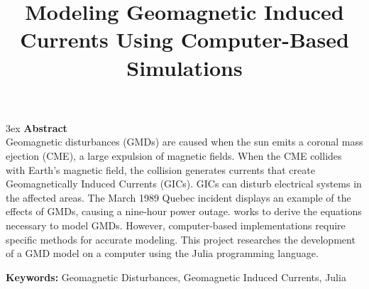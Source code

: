 \documentclass[10pt,a4paper,twoside]{article}
\renewcommand{\doctitle}        {Modeling Geomagnetic Induced Currents Using Computer-Based Simulations}
\renewcommand{\docaffiliation} { }
\renewcommand{\docauthor} { }
\begin{document}



\title{\doctitle}{\docauthor}{\docaffiliation}


\setlength\columnsep{1cm}

\begin{multicols}{2}
		
	{\parindent 3ex 
		\textbf{\textsf{Abstract}} %
		\\
		Geomagnetic disturbances (GMDs) are caused when the sun emits a coronal mass ejection (CME), a large expulsion of magnetic fields. When the CME collides with Earth's magnetic field, the collision generates currents that create Geomagnetically Induced Currents (GICs). GICs can disturb electrical systems in the affected areas. The March 1989 Quebec incident displays an example of the effects of GMDs, causing a nine-hour power outage. \cite{8859181} works to derive the equations necessary to model GMDs. However, computer-based implementations require specific methods for accurate modeling. This project researches the development of a GMD model on a computer using the Julia programming language. 
				
				
		\textbf{\textsf{Keywords:}} Geomagnetic Disturbances, Geomagnetic Induced Currents, Julia}
		
		
		

\end{multicols}
\end{document}
